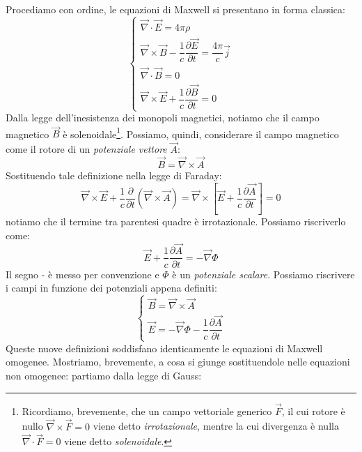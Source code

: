 Procediamo con ordine, le equazioni di Maxwell si presentano in forma classica:
\begin{equation*}
\begin{cases}
  \Vec{\nabla}\cdot\Vec{E}=4\pi\rho\\ 
  \Vec{\nabla}\times\Vec{B}-\dfrac{1}{c}\dfrac{\partial\Vec{E}}{\partial t}=\dfrac{4\pi}{c}\Vec{j}
    \\
    \Vec{\nabla}\cdot\Vec{B}=0 \\
  \Vec{\nabla}\times\Vec{E}+\dfrac{1}{c}\dfrac{\partial\Vec{B}}{\partial t} =0
\end{cases}
\end{equation*}
Dalla legge dell'inesistenza dei monopoli magnetici, notiamo che il campo magnetico $\Vec{B}$ è solenoidale\footnote{Ricordiamo, brevemente, che un campo vettoriale generico $\Vec{F}$, il cui rotore è nullo $\Vec{\nabla}\times\Vec{F}=0$ viene detto \textit{irrotazionale}, mentre la cui divergenza è nulla $\Vec{\nabla}\cdot\Vec{F}=0$ viene detto \textit{solenoidale}.}. Possiamo, quindi, considerare il campo magnetico come il rotore di un \textit{potenziale vettore} $\Vec{A}$:
\begin{equation}
    \Vec{B}=\Vec{\nabla}\times\Vec{A}
\end{equation}
Sostituendo tale definizione nella legge di Faraday:
\begin{equation}
    \Vec{\nabla}\times\Vec{E}+\dfrac{1}{c}\dfrac{\partial}{\partial t}(\Vec{\nabla}\times\Vec{A})=\Vec{\nabla}\times\left[\Vec{E}+\dfrac{1}{c}\dfrac{\partial\Vec{A}}{\partial t}\right]=0
\end{equation}
notiamo che il termine tra parentesi quadre è irrotazionale. Possiamo riscriverlo come:
\begin{equation}
    \Vec{E}+\dfrac{1}{c}\dfrac{\partial\Vec{A}}{\partial t}=-\Vec{\nabla}\Phi
    \end{equation}
Il segno - è messo per convenzione e $\Phi$ è un \textit{potenziale scalare}. Possiamo riscrivere i campi in funzione dei potenziali appena definiti:
\begin{equation*}
\begin{cases}
    \Vec{B}=\Vec{\nabla}\times\Vec{A}\\
    \Vec{E}=-\Vec{\nabla}\Phi-\dfrac{1}{c}\dfrac{\partial\Vec{A}}{\partial t}
\end{cases}
\end{equation*}
Queste nuove definizioni soddisfano identicamente le equazioni di Maxwell omogenee. Mostriamo, brevemente, a cosa si giunge sostituendole nelle equazioni non omogenee: partiamo dalla legge di Gauss:
